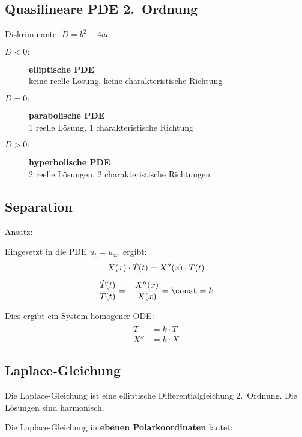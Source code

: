 	\subsection{Quasilineare PDE 2.~Ordnung} %
		Diskriminante: $\displaystyle D=b^2-4ac$
		\begin{description}
			\item[$D < 0\!:$] \textbf{elliptische PDE} \\
			keine reelle Lösung, keine charakteristische Richtung
			\item[$D = 0\!:$] \textbf{parabolische PDE} \\
			1 reelle Lösung, 1 charakteristische Richtung
			\item[$D > 0\!:$] \textbf{hyperbolische PDE} \\
			2 reelle Lösungen, 2 charakteristische Richtungen
		\end{description}
	\subsection{Separation} %
		Ansatz:
		
		Eingesetzt in die PDE $u_t = u_{xx}$ ergibt:
		\begin{gather*}
			X(x) \cdot \dot T(t) = X''(x) \cdot T(t) \\[1ex]
			\frac{\dot T(t)}{T(t)} = -\frac{X''(x)}{X(x)} = \const = k
		\end{gather*}
		
		Dies ergibt ein System homogener ODE:
		\begin{align*}
			\dot T &= k\cdot T \\
			X'' &= k \cdot X
		\end{align*}
	\subsection{Laplace-Gleichung} %
		Die Laplace-Gleichung
		ist eine elliptische Differentialgleichung 2.~Ordnung.
		Die Lösungen sind harmonisch.
		
		Die Laplace-Gleichung in \textbf{ebenen Polarkoordinaten} lautet:
